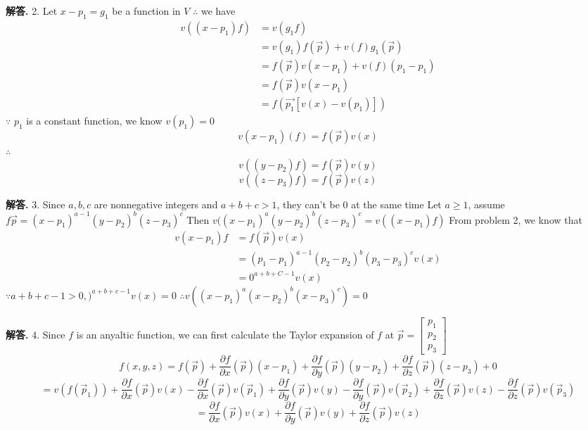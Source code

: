 \documentclass[12pt, a4paper, oneside]{article}
\newenvironment{solution}{\par\noindent\textbf{解答. }}{\par}
\begin{document}
\begin{CJK}{UTF8}{gbsn}
\begin{solution}
  2.  \newline
  Let $x-p_1=g_1$ be a function in $V$ \newline
  $\therefore$ we have 
  \begin{align}
    v((x-p_1)f) &= v(g_1f) \nonumber\\ 
    & =v(g_1)f(\vec{p})+v(f)g_1(\vec{p}) \nonumber\\
    & =f(\vec{p})v(x-p_1) + v(f)(p_1-p_1) \nonumber\\
    & =f(\vec{p})v(x-p_1) \nonumber\\
    & =f(\vec{p_1}\left[v(x)-v(p_1)\right]) \nonumber
  \end{align}
  $\because$ $p_1$ is a constant function, we know $v(p_1) = 0$
  $$ v(x-p_1)(f) = f(\vec{p})v(x)$$ 
  $\therefore$
  $$ v((y-p_2)f) = f(\vec{p})v(y) $$
  $$ v((z-p_3)f) = f(\vec{p})v(z) $$
\end{solution}

\begin{solution}
  3. \newline
  Since $a,b,c$ are nonnegative integers and $a+b+c>1$, they can't be 0 at the same time \newline
  Let $a \geq 1$, assume $f\vec{p} = (x-p_1)^{a-1}(y-p_2)^b(z-p_3)^c$ \newline
  Then $v((x-p_1)^a(y-p_2)^b(z-p_3)^c = v((x-p_1)f)$
  From problem 2, we know that 
  \begin{align}
     v(x-p_1)f &= f(\vec{p})v(x) \nonumber\\
     & = (p_1-p_1)^{a-1}(p_2-p_2)^b(p_3-p_3)^cv(x)  \nonumber\\
     & = 0^{a+b+C-1}v(x) \nonumber
  \end{align}
  $\because a+b+c-1>0, )^{a+b+c-1}v(x) = 0$ \newline
  $\therefore v((x-p_1)^a(x-p_2)^b(x-p_3)^c)=0$
\end{solution}

\begin{solution}
  4.\newline
  Since $f$ is an anyaltic function, we can first calculate the Taylor expansion of $f$ at $\vec{p} = \begin{bmatrix}
    p_1 \\ p_2 \\ p_3
  \end{bmatrix}$
  $$ f(x,y,z) = f(\vec{p}) + \frac{\partial f}{\partial x}(\vec{p})(x-p_1) + \frac{\partial f}{\partial y}(\vec{p})(y-p_2) + \frac{\partial f}{\partial z}(\vec{p})(z-p_3) + 0$$
  $$ = v(f(\vec{p}_1)) + \frac{\partial f}{\partial x}(\vec{p})v(x)-\frac{\partial f}{\partial x}(\vec{p})v(\vec{p}_1) + \frac{\partial f}{\partial y}(\vec{p})v(y)-\frac{\partial f}{\partial y}(\vec{p})v(\vec{p}_2) + \frac{\partial f}{\partial z}({\vec{p}})v(z) - \frac{\partial f}{\partial z}(\vec{p})v(\vec{p}_3)$$ 
  $$ = \frac{\partial f}{\partial x}(\vec{p})v(x)+\frac{\partial f}{\partial y}(\vec{p})v(y) + \frac{\partial f}{\partial z}(\vec{p})v(z)$$
\end{solution}


\end{CJK}
\end{document}
